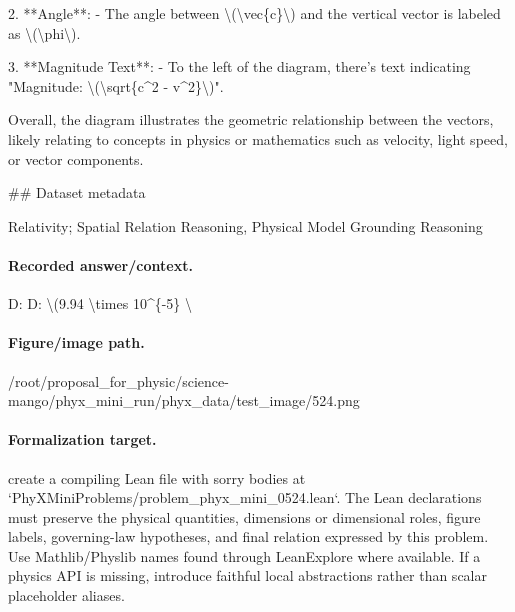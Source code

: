2. **Angle**:
   - The angle between \textbackslash{}(\textbackslash{}vec\{c\}\textbackslash{}) and the vertical vector is labeled as \textbackslash{}(\textbackslash{}phi\textbackslash{}).

3. **Magnitude Text**:
   - To the left of the diagram, there's text indicating "Magnitude: \textbackslash{}(\textbackslash{}sqrt\{c\textasciicircum{}2 - v\textasciicircum{}2\}\textbackslash{})".

Overall, the diagram illustrates the geometric relationship between the vectors, likely relating to concepts in physics or mathematics such as velocity, light speed, or vector components.

\#\# Dataset metadata

Relativity; Spatial Relation Reasoning, Physical Model Grounding Reasoning

\paragraph{Recorded answer/context.}
D: D: \textbackslash{}(9.94 \textbackslash{}times 10\textasciicircum{}\{-5\} \textbackslash{}

\paragraph{Figure/image path.}
/root/proposal\_for\_physic/science-mango/phyx\_mini\_run/phyx\_data/test\_image/524.png

\paragraph{Formalization target.}
create a compiling Lean file with sorry bodies at `PhyXMiniProblems/problem\_phyx\_mini\_0524.lean`. The Lean declarations must preserve the physical quantities, dimensions or dimensional roles, figure labels, governing-law hypotheses, and final relation expressed by this problem.
Use Mathlib/Physlib names found through LeanExplore where available. If a physics API is missing, introduce faithful local abstractions rather than scalar placeholder aliases.

